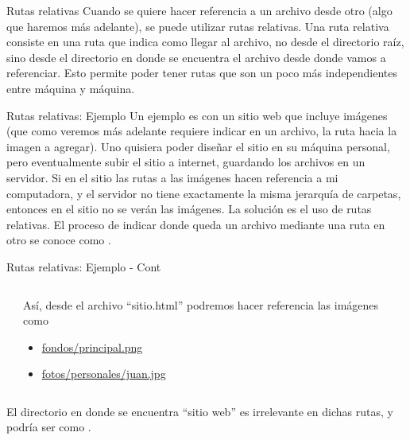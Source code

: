 \begin{frame}{Rutas relativas}
  Cuando se quiere hacer referencia a un archivo desde otro
  (algo que haremos más adelante), se puede utilizar rutas relativas.
  \jump
  Una ruta relativa consiste en una ruta que indica como llegar al archivo,
  no desde el directorio raíz, sino desde el directorio en donde se
  encuentra el archivo desde donde vamos a referenciar.
  \jump
  Esto permite poder tener rutas que son un poco más independientes
  entre máquina y máquina.
\end{frame}


\begin{frame}{Rutas relativas: Ejemplo}
  Un ejemplo es con un sitio web que incluye imágenes (que como veremos más
  adelante requiere indicar en un archivo, la ruta hacia la imagen a agregar).
  \jump
  Uno quisiera poder diseñar el sitio en su máquina personal, pero eventualmente
  subir el sitio a internet, guardando los archivos en un servidor. Si en el
  sitio las rutas a las imágenes hacen referencia a mi computadora, y el servidor
  no tiene exactamente la misma jerarquía de carpetas, entonces en el sitio no se
  verán las imágenes.
  \jump
  La solución es el uso de rutas relativas.
  \jump
  El proceso de indicar donde queda un archivo mediante una ruta en otro se
  conoce como .
\end{frame}


\begin{frame}{Rutas relativas: Ejemplo - Cont}
  \begin{columns}
    \begin{column}{0.5\textwidth}
    \end{column}
    \begin{column}{0.5\textwidth}
      Así, desde el archivo ``sitio.html'' podremos hacer
      referencia las imágenes como
      \begin{itemize}
        \item \url{fondos/principal.png}
        \item \url{fotos/personales/juan.jpg}
      \end{itemize}
    \end{column}
  \end{columns}
  \jump
  El directorio en donde se encuentra ``sitio web'' es irrelevante en dichas
  rutas, y podría ser  como
  .
\end{frame}

